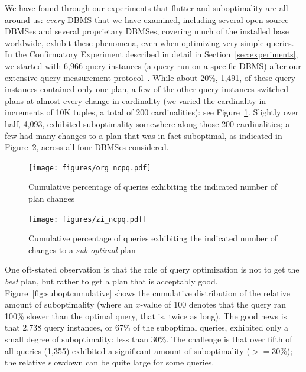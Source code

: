 \documentclass[prodmode,acmtods]{acmsmall}
\begin{document}
We have found through our experiments that flutter and suboptimality are all
around us: {\em every} \hbox{DBMS} that we have examined, including several
open source \hbox{DBMSes} and several proprietary
\hbox{DBMSes}, covering much of the installed base worldwide, exhibit these
phenomena, even when optimizing very simple queries. In the Confirmatory
Experiment described in detail in Section~\ref{sec:experiments}, we started
with 6,966 query instances (a query run on a specific \hbox{DBMS}) after our extensive query measurement
protocol~. While about 20\%,
1,491, of these query instances contained only one
plan, a few of the other query instances switched plans at almost every change in cardinality (we varied the
cardinality in increments of 10K tuples, a total of 200 cardinalities): see
Figure~\ref{fig:planchanges}. Slightly over half, 4,093, exhibited
suboptimality somewhere along those 200 cardinalities; a few had
many changes to a plan that was in fact suboptimal, as indicated in
Figure~\ref{fig:suboptplanchanges}, across all four \hbox{DBMSes} considered.

\begin{figure}[h!]\centering
\texttt{[image: figures/org\_ncpq.pdf]}
\caption{Cumulative percentage of queries \hbox{exhibiting} the \hbox{indicated}
  number of plan changes\label{fig:planchanges}}
\end{figure}

\begin{figure}[t]\centering
\texttt{[image: figures/zi\_ncpq.pdf]}
\caption{Cumulative percentage of queries exhibiting the \hbox{indicated}
  number of changes to a {\em sub-optimal}
  plan\label{fig:suboptplanchanges}}
\vspace*{-2ex}
\end{figure}

One oft-stated observation is that the role of query optimization is not to
get the {\em best} plan, but rather to get a plan that is acceptably
good. Figure~\ref{fig:suboptcumulative} shows
the cumulative distribution of the relative amount of suboptimality (where
an $x$-value of 100 denotes that the query ran 100\% slower than the optimal
query, that is, twice as long). The good news is that 2,738 query instances,
or 67\% of the suboptimal queries, exhibited only a small degree of
suboptimality: less than 30\%. The challenge is that over fifth of all
queries (1,355) exhibited a significant amount of suboptimality ($>= 30\%$); the
relative slowdown can be quite large for some queries.
\end{document}
